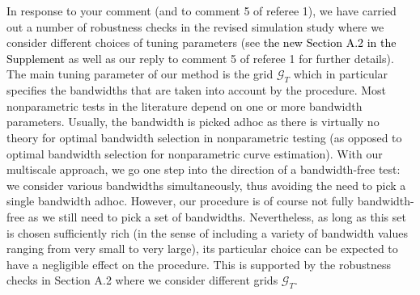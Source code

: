 \documentclass[a4paper,12pt]{article}
\newcommand{\reference}[1]{\textcolor{black}{#1}}
\begin{document}
\begin{enumerate}[label=\arabic*.,leftmargin=0.6cm]
In response to your comment (and to comment 5 of referee 1), we have carried out a number of robustness checks in the revised simulation study where we consider different choices of tuning parameters (see \reference{the new Section A.2 in the Supplement} as well as our reply to comment 5 of referee 1 for further details). \\
The main tuning parameter of our method is the grid $\mathcal{G}_T$ which in particular specifies the bandwidths that are taken into account by the procedure.
Most nonparametric tests in the literature depend on one or more bandwidth para\-meters. Usually, the bandwidth is picked adhoc as there is virtually no theory for optimal bandwidth selection in nonparametric testing (as opposed to optimal bandwidth selection for nonparametric curve estimation). With our multiscale approach, we go one step into the direction of a bandwidth-free test: we consider various bandwidths simultaneously, thus avoiding the need to pick a single bandwidth adhoc. However, our procedure is of course not fully bandwidth-free as we still need to pick a set of bandwidths. Nevertheless, as long as this set is chosen sufficiently rich (in the sense of including a variety of bandwidth values ranging from very small to very large), its particular choice can be expected to have a negligible effect on the procedure. This is supported by the robustness checks in Section A.2 where we consider different grids $\mathcal{G}_T$. \\

\end{enumerate}
\end{document}
